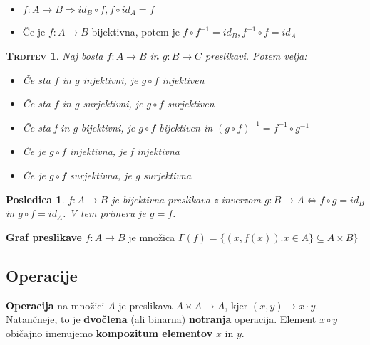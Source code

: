 \documentclass[a4paper,12pt]{article}
\newtheorem*{trditev}{\textsc{Trditev}}
\newtheorem*{posl}{Posledica}
\begin{document}
\begin{itemize}
\item $f: A \to B \Rightarrow id_B \circ f, f \circ id_A = f$
\item Če je $f: A \to B$ bijektivna, potem je $f \circ f^{-1} = id_B, f^{-1} \circ f = id_A$\\
\end{itemize}

\begin{trditev}
Naj bosta $f: A \to B$ in $g: B \to C$ preslikavi. Potem velja: 
\begin{itemize}
\item[1)] Če sta $f$ in $g$ injektivni, je $g \circ f$ injektiven
\item[2)] Če sta $f$ in $g$ surjektivni, je $g \circ f$ surjektiven
\item[3)] Če sta f in g bijektivni, je $g \circ f$ bijektiven in $(g \circ f)^{-1} = f^{-1} \circ g^{-1} $
\item[4)] Če je $g \circ f $ injektivna, je f injektivna 
\item[5)] Če je $ g \circ f $ surjektivna, je g surjektivna \\
\end{itemize}
\end{trditev}

\begin{posl}
$f: A \to B$ je bijektivna preslikava z inverzom $g: B \to A \Leftrightarrow f \circ g = id_B$ in $g \circ f = id_A$. V tem primeru je $g=f$. \\
\end{posl}

\textbf{Graf preslikave} $f: A \to B$ je množica $\Gamma(f) = \{(x,f(x)).x\in A \} \subseteq A \times B\} $

\newpage

\begin{center}
\subsection{Operacije}
\end{center}

\noindent \textbf{Operacija} na množici $A$ je preslikava $A \times A \to A$, kjer  $(x,y) \mapsto x \cdot y$. Natančneje, to je \textbf{dvočlena} (ali binarna) \textbf{notranja} operacija. Element $x \circ y$ običajno imenujemo \linebreak \textbf{kompozitum elementov} $x$ in $y$. \\
\end{document}
